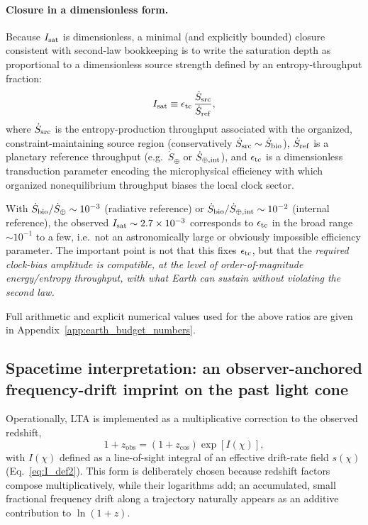\documentclass[10pt]{article}
\newcommand{\zobs}{z_{\mathrm{obs}}}
\newcommand{\zcos}{z_{\mathrm{cos}}}
\begin{document}
\paragraph{Closure in a dimensionless form.}
Because \(I_{\rm sat}\) is dimensionless, a minimal (and explicitly bounded) closure consistent with
second-law bookkeeping is to write the saturation depth as proportional to a dimensionless source
strength defined by an entropy-throughput fraction:
\begin{equation}
I_{\rm sat} \equiv \epsilon_{\rm tc}\,
\frac{\dot S_{\rm src}}{\dot S_{\rm ref}},
\label{eq:Isat_budget_closure}
\end{equation}
where \(\dot S_{\rm src}\) is the entropy-production throughput associated with the organized,
constraint-maintaining source region (conservatively \(\dot S_{\rm src}\sim \dot S_{\rm bio}\)),
\(\dot S_{\rm ref}\) is a planetary reference throughput (e.g.\ \(\dot S_{\oplus}\) or
\(\dot S_{\oplus,{\rm int}}\)), and \(\epsilon_{\rm tc}\) is a dimensionless transduction parameter
encoding the microphysical efficiency with which organized nonequilibrium throughput biases the
local clock sector.

With \(\dot S_{\rm bio}/\dot S_{\oplus}\sim 10^{-3}\) (radiative reference) or
\(\dot S_{\rm bio}/\dot S_{\oplus,{\rm int}}\sim 10^{-2}\) (internal reference),
the observed \(I_{\rm sat}\sim 2.7\times 10^{-3}\) corresponds to
\(\epsilon_{\rm tc}\) in the broad range \(\sim 10^{-1}\) to a few, i.e.\ not an astronomically
large or obviously impossible efficiency parameter. The important point is not that this fixes
\(\epsilon_{\rm tc}\), but that the \emph{required clock-bias amplitude is compatible, at the level
of order-of-magnitude energy/entropy throughput, with what Earth can sustain without violating the
second law.}

Full arithmetic and explicit numerical values used for the above ratios are given in
Appendix~\ref{app:earth_budget_numbers}.


\subsection{Spacetime interpretation: an observer-anchored frequency-drift imprint on the past light cone}
\label{sec:discussion_timewave}

Operationally, LTA is implemented as a multiplicative correction to the observed redshift,
\begin{equation}
1+\zobs = (1+\zcos)\exp[I(\chi)],
\end{equation}
with $I(\chi)$ defined as a line-of-sight integral of an effective drift-rate field $s(\chi)$
(Eq.~\eqref{eq:I_def2}). This form is deliberately chosen because redshift factors compose
multiplicatively, while their logarithms add; an accumulated, small fractional frequency drift along
a trajectory naturally appears as an additive contribution to $\ln(1+z)$.
\end{document}
